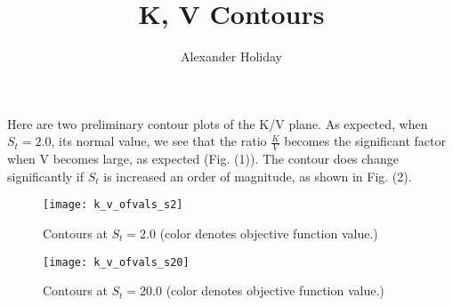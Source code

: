 \documentclass[11pt]{article}
\title{K, V Contours}
\author{Alexander Holiday}
\begin{document}
\maketitle

Here are two preliminary contour plots of the K/V plane. As expected, when $S_t=2.0$, its normal value, we see that the ratio $\frac{K}{V}$ becomes the significant factor when V becomes large, as expected (Fig. (1)). The contour does change significantly if $S_t$ is increased an order of magnitude, as shown in Fig. (2).

\begin{figure}[htbp]
  \centering
  \texttt{[image: k\_v\_ofvals\_s2]}
  \caption{Contours at $S_t=2.0$ (color denotes objective function value.)}
\end{figure}

\begin{figure}[htbp]
  \centering
  \texttt{[image: k\_v\_ofvals\_s20]}
  \caption{Contours at $S_t=20.0$ (color denotes objective function value.)}
\end{figure}

% 
% 
\end{document}
